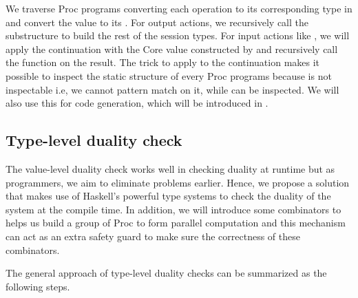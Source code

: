 We traverse Proc programs converting each operation to its corresponding type in  and convert the value to its . For output actions, we recursively call the substructure to build the rest of the session types. For input actions like , we will apply the continuation with the Core value constructed by  and recursively call the function on the result. The trick to apply  to the continuation makes it possible to inspect the static structure of every Proc programs because  is not inspectable i.e, we cannot pattern match on it, while  can be inspected. We will also use this for code generation, which will be introduced in .
\subsection{Type-level duality check} %
The value-level duality check works well in checking duality at runtime but as programmers, we aim to eliminate problems earlier. Hence, we propose a solution that makes use of Haskell's powerful type systems to check the duality of the system at the compile time. In addition, we will introduce some combinators to helps us build a group of Proc to form parallel computation and this mechanism can act as an extra safety guard to make sure the correctness of these combinators.

The general approach of type-level duality checks can be summarized as the following steps.

